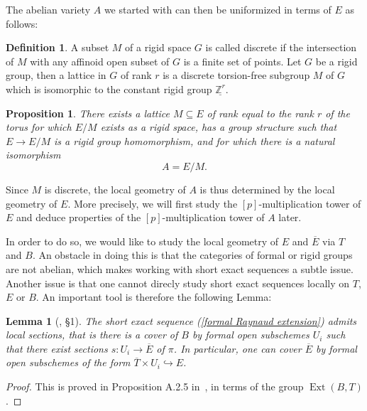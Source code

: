 \documentclass[11pt,oneside]{amsart}
\newtheorem{lemma}[theorem]{Lemma}
\newtheorem{proposition}[theorem]{Proposition}
\theoremstyle{definition}
\newtheorem{definition}[theorem]{Definition}
\theoremstyle{remark}
\begin{document}
	The abelian variety $A$ we started with can then be uniformized in terms of $E$ as follows:
	
	\begin{definition}
		A subset $M$ of a rigid space $G$ is called discrete if the intersection of $M$ with any affinoid open subset of $G$ is a finite set of points.
		Let $G$ be a rigid group, then a lattice in $G$ of rank $r$ is a discrete torsion-free subgroup $M$ of $G$ which is isomorphic to the constant rigid group $\underline{\mathbb Z^r}$. 
	\end{definition}
	
	\begin{proposition}\label{Raynaud uniformisation}
		There exists a lattice $M \subseteq E$ of rank equal to the rank $r$ of the torus for which $E/M$ exists as a rigid space, has a group structure such that $E\rightarrow E/M$ is a rigid group homomorphism, and for which there is a natural isomorphism
		\[A=E/M.\]
	\end{proposition}
	
	Since $M$ is discrete, the local geometry of $A$ is thus determined by the local geometry of $E$. More precisely, we will first study the $[p]$-multiplication tower of $E$ and deduce properties of the $[p]$-multiplication tower of $A$ later.
	
	In order to do so, we would like to study the local geometry of $E$ and $\overline{E}$ via $T$ and $B$. An obstacle in doing this is that the categories of formal or rigid groups are not abelian, which makes working with short exact sequences a subtle issue. Another issue is that one cannot direcly study short exact sequences locally on $T$, $E$ or $B$. An important tool is therefore the following Lemma:

	\begin{lemma}[\cite{BL}, \S 1]\label{formal Raynaud sequence is locally split}
		The short exact sequence (\ref{formal Raynaud extension}) admits local sections, that is there is a cover of $B$ by formal open subschemes $U_i$ such that there exist sections $s:U_i\rightarrow \overline{E}$ of $\pi$. In particular, one can cover $\overline{E}$ by formal open subschemes of the form $\overline{T}\times U_i\hookrightarrow E$.
	\end{lemma}
	\begin{proof}
		This is proved in Proposition A.2.5 in~\cite{rigid geometry of curves}, in terms of the group $\operatorname{Ext}(B,T)$.
	\end{proof}
	
\end{document}
